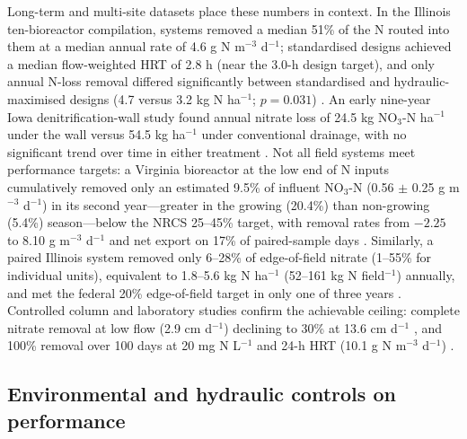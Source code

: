 \documentclass[11pt]{article}
\begin{document}
Long-term and multi-site datasets place these numbers in context. In the Illinois ten-bioreactor compilation, systems removed a median 51\% of the N routed into them at a median annual rate of 4.6 g N m$^{-3}$ d$^{-1}$; standardised designs achieved a median flow-weighted HRT of 2.8 h (near the 3.0-h design target), and only annual N-loss removal differed significantly between standardised and hydraulic-maximised designs (4.7 versus 3.2 kg N ha$^{-1}$; $p=0.031$) \parencite{Christianson2026}. An early nine-year Iowa denitrification-wall study found annual nitrate loss of 24.5 kg NO$_3$-N ha$^{-1}$ under the wall versus 54.5 kg ha$^{-1}$ under conventional drainage, with no significant trend over time in either treatment \parencite{Moorman2010}. Not all field systems meet performance targets: a Virginia bioreactor at the low end of N inputs cumulatively removed only an estimated 9.5\% of influent NO$_3$-N (0.56 $\pm$ 0.25 g m$^{-3}$ d$^{-1}$) in its second year---greater in the growing (20.4\%) than non-growing (5.4\%) season---below the NRCS 25--45\% target, with removal rates from $-2.25$ to 8.10 g m$^{-3}$ d$^{-1}$ and net export on 17\% of paired-sample days \parencite{Bock2018}. Similarly, a paired Illinois system removed only 6--28\% of edge-of-field nitrate (1--55\% for individual units), equivalent to 1.8--5.6 kg N ha$^{-1}$ (52--161 kg N field$^{-1}$) annually, and met the federal 20\% edge-of-field target in only one of three years \parencite{Maxwell2022}. Controlled column and laboratory studies confirm the achievable ceiling: complete nitrate removal at low flow (2.9 cm d$^{-1}$) declining to 30\% at 13.6 cm d$^{-1}$ \parencite{Greenan2009}, and 100\% removal over 100 days at 20 mg N L$^{-1}$ and 24-h HRT (10.1 g N m$^{-3}$ d$^{-1}$) \parencite{Hua2016}.

\subsection{Environmental and hydraulic controls on performance}
\end{document}
